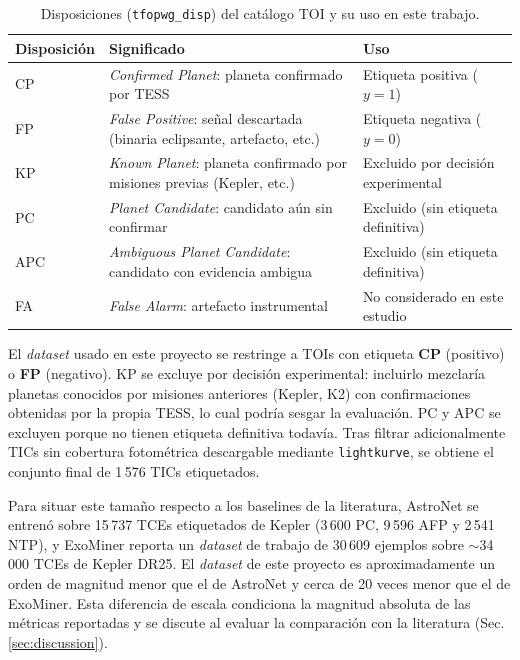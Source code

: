 \documentclass[11pt,a4paper]{article}
\begin{document}
\begin{table}[H]
\centering
\caption{Disposiciones (\texttt{tfopwg\_disp}) del catálogo TOI y su
uso en este trabajo.}
\label{tab:tfopwg-dispositions}
\renewcommand{\arraystretch}{1.2}
\begin{tabular}{l p{} l}
\toprule
\textbf{Disposición} & \textbf{Significado} & \textbf{Uso} \\
\midrule
CP  & \textit{Confirmed Planet}: planeta confirmado por TESS &
  Etiqueta positiva ($y = 1$) \\
FP  & \textit{False Positive}: señal descartada (binaria
  eclipsante, artefacto, etc.) &
  Etiqueta negativa ($y = 0$) \\
KP  & \textit{Known Planet}: planeta confirmado por misiones
  previas (Kepler, etc.) &
  Excluido por decisión experimental \\
PC  & \textit{Planet Candidate}: candidato aún sin confirmar &
  Excluido (sin etiqueta definitiva) \\
APC & \textit{Ambiguous Planet Candidate}: candidato con
  evidencia ambigua &
  Excluido (sin etiqueta definitiva) \\
FA  & \textit{False Alarm}: artefacto instrumental &
  No considerado en este estudio \\
\bottomrule
\end{tabular}
\end{table}

El \textit{dataset} usado en este proyecto se restringe a TOIs con
etiqueta \textbf{CP} (positivo) o \textbf{FP} (negativo). KP se
excluye por decisión experimental: incluirlo mezclaría planetas
conocidos por misiones anteriores (Kepler, K2) con confirmaciones
obtenidas por la propia TESS, lo cual podría sesgar la evaluación.
PC y APC se excluyen porque no tienen etiqueta definitiva todavía.
Tras filtrar adicionalmente TICs sin cobertura fotométrica
descargable mediante \texttt{lightkurve}, se obtiene el conjunto
final de 1\,576 TICs etiquetados. 

Para situar este tamaño respecto a los baselines de la literatura,
AstroNet \cite{shallue2018} se entrenó sobre 15\,737 TCEs etiquetados
de Kepler (3\,600 PC, 9\,596 AFP y 2\,541 NTP), y ExoMiner
\cite{exominer} reporta un \textit{dataset} de trabajo de 30\,609
ejemplos sobre $\sim$34\,000 TCEs de Kepler DR25. El \textit{dataset}
de este proyecto es aproximadamente un orden de magnitud menor que el
de AstroNet y cerca de 20 veces menor que el de ExoMiner. Esta
diferencia de escala condiciona la magnitud absoluta de las métricas
reportadas y se discute al evaluar la comparación con la literatura
(Sec.\ref{sec:discussion}).
\end{document}
